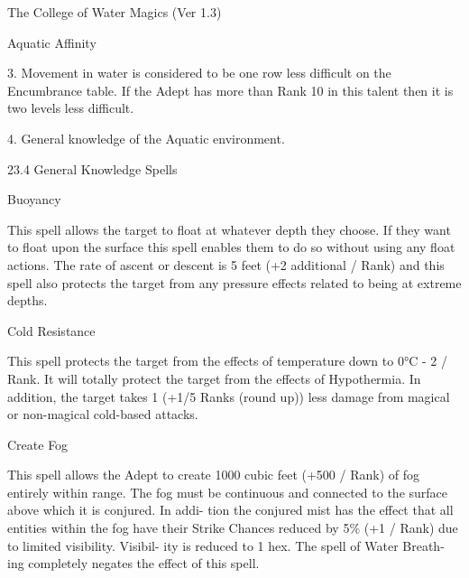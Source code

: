 \begin{Chapter}{The College of Water Magics (Ver 1.3)}
\begin{talent}[T-3]{Aquatic Affinity }
\begin{effects}
3. Movement in water is considered to be one row 
less  difficult  on  the  Encumbrance  table.  If  the 
Adept has more than Rank 10 in this talent then it 
is two levels less difficult. 

4. General knowledge of the Aquatic environment. 

23.4 General Knowledge Spells 



\end{effects}
\end{talent}

\begin{spell}[G-1]{Buoyancy }

\begin{effects}
 This  spell  allows  the  target  to  float  at 
whatever  depth  they  choose.  If  they  want  to  float 
upon  the  surface  this  spell  enables  them  to  do  so 
without  using  any  float  actions.  The rate  of  ascent 
or descent is 5 feet (+2 additional / Rank) and this 
spell  also  protects  the  target  from  any  pressure 
effects related to being at extreme depths. 

\end{effects}
\end{spell}

\begin{spell}[G-2]{Cold Resistance }

\begin{effects}
 This  spell  protects  the  target  from  the 
effects  of  temperature  down  to  0°C  -  2  /  Rank.  It 
will  totally  protect  the  target  from  the  effects  of 
Hypothermia.  In  addition,  the  target  takes  1  (+1/5 
Ranks  (round  up))  less  damage  from  magical  or 
non-magical cold-based attacks. 

\end{effects}
\end{spell}

\begin{spell}[G-3]{Create Fog }

\begin{effects}
This spell allows the Adept to create 1000 
cubic  feet  (+500  /  Rank)  of  fog  entirely  within 
range.  The  fog  must  be  continuous  and  connected 
to  the  surface  above  which  it  is conjured.  In  addi-
tion the conjured mist has the effect that all entities 
within  the  fog  have  their  Strike  Chances  reduced 
by 5\% (+1 / Rank) due to limited visibility. Visibil-
ity is reduced to 1 hex. The spell of Water Breath-
ing completely negates the effect of this spell. 


\end{effects}
\end{spell}
\end{Chapter}

